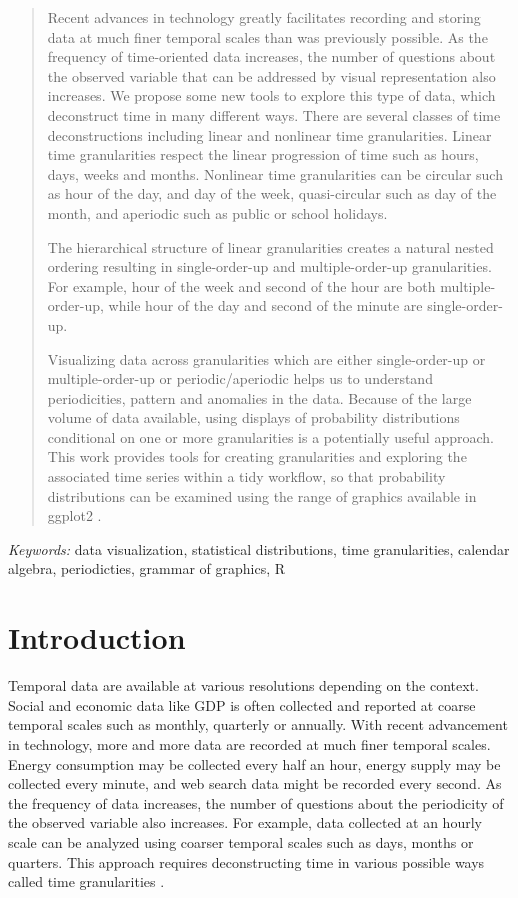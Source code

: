 \documentclass[12pt]{article}
\begin{document}
\bigskip
\begin{abstract}
Recent advances in technology greatly facilitates recording and storing data at much finer temporal scales than was previously possible. As the frequency of time-oriented data increases, the number of questions about the observed variable that can be addressed by visual representation also increases. We propose some new tools to explore this type of data, which deconstruct time in many different ways. There are several classes of time deconstructions including linear and nonlinear time granularities. Linear time granularities respect the linear progression of time such as hours, days, weeks and months. Nonlinear time granularities can be circular such as hour of the day, and day of the week, quasi-circular such as day of the month, and aperiodic such as public or school holidays.

The hierarchical structure of linear granularities creates a natural nested ordering resulting in single-order-up and multiple-order-up granularities. For example, hour of the week and second of the hour are both multiple-order-up, while hour of the day and second of the minute are single-order-up.

Visualizing data across granularities which are either single-order-up or multiple-order-up or periodic/aperiodic helps us to understand periodicities, pattern and anomalies in the data. Because of the large volume of data available, using displays of probability distributions conditional on one or more granularities is a potentially useful approach. This work provides tools for creating granularities and exploring the associated time series within a tidy workflow, so that probability distributions can be examined using the range of graphics available in ggplot2 \citep{Wickham2009pk}.
\end{abstract}

\noindent%
{\it Keywords:} data visualization, statistical distributions, time granularities, calendar algebra, periodicties, grammar of graphics, R
\vfill

\newpage
{} %

\hypertarget{introduction}{%
\section{Introduction}\label{introduction}}

Temporal data are available at various resolutions depending on the context. Social and economic data like GDP is often collected and reported at coarse temporal scales such as monthly, quarterly or annually. With recent advancement in technology, more and more data are recorded at much finer temporal scales. Energy consumption may be collected every half an hour, energy supply may be collected every minute, and web search data might be recorded every second. As the frequency of data increases, the number of questions about the periodicity of the observed variable also increases. For example, data collected at an hourly scale can be analyzed using coarser temporal scales such as days, months or quarters. This approach requires deconstructing time in various possible ways called time granularities \citep{aigner2011visualization}.
\end{document}
